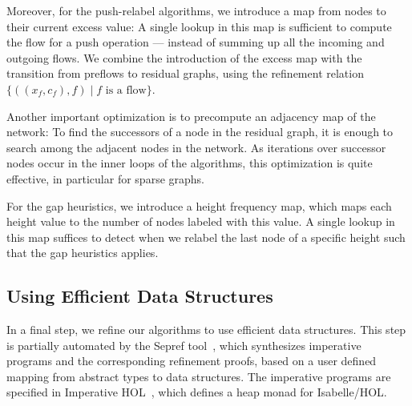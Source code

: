 \documentclass[smallcondensed]{svjour3}     %
\begin{document}
  Moreover, for the push-relabel algorithms, we introduce a map from nodes to their current excess value: 
  A single lookup in this map is sufficient to compute the flow for a push operation --- instead of summing up all 
  the incoming and outgoing flows. We combine the introduction of the excess map with the transition from preflows to residual 
  graphs, using the refinement relation $\{((x_f,c_f),f) \mid \text{$f$ is a flow}\}$.
  
  Another important optimization is to precompute an adjacency map of the network:
  To find the successors of a node in the residual graph, it is enough to search among the adjacent nodes in the network. 
  As iterations over successor nodes occur in the inner loops of the algorithms, this optimization is quite effective, in particular for sparse graphs.

  For the gap heuristics, we introduce a height frequency map, which maps each height value to the number of nodes labeled with this value.
  A single lookup in this map suffices to detect when we relabel the last node of a specific height such that the gap heuristics applies.
  
  
  
  \subsection{Using Efficient Data Structures}\label{sec:impl_data_structures}
  In a final step, we refine our algorithms to use efficient data structures.
  This step is partially automated by the Sepref tool~\cite{La15,La16}, which synthesizes imperative programs and 
  the corresponding refinement proofs, based on a user defined mapping from abstract types to data structures.
  The imperative programs are specified in Imperative HOL~\cite{BKHEM08}, which defines a heap monad for Isabelle/HOL.
\end{document}
